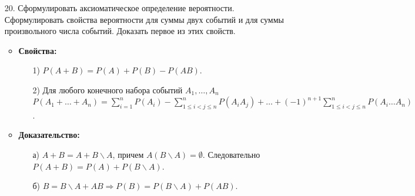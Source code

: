 \documentclass[a4paper]{article}
\begin{document}
\begin{enumerate}
\item[20.] Сформулировать аксиоматическое определение вероятности. Сформулировать свойства вероятности для суммы двух событий и для суммы произвольного числа событий. Доказать первое из этих свойств.
\begin{itemize}
\item \textbf{Свойства:} 
	\begin{enumerate}
	\item[1)] $P(A+B) = P(A) + P(B) - P(AB)$.
	\item[2)] Для любого конечного набора событий $A_1, \ldots, A_n$ $P(A_1 + \ldots + A_n) = \sum\limits_{i = 1}^{n} P(A_i) - \sum\limits_{1 \leqslant i < j \leqslant n}^{n} P(A_i A_j) + \ldots + (-1)^{n+1} \sum\limits_{1 \leqslant i < j \leqslant n}^{n} P(A_i \ldots A_n)$.
	\end{enumerate}
\item \textbf{Доказательство:} 
	\begin{enumerate}
	\item[а)] $A + B = A + B \backslash A$, причем $A(B \backslash A) = \emptyset$. Следовательно $P(A+B) = P(A) + P(B \backslash A)$.
	\item[б)] $B = B \backslash A + AB \Rightarrow P(B) = P(B \backslash A) + P(AB)$.
	\end{enumerate}
\end{itemize}




\end{enumerate}
\end{document}

